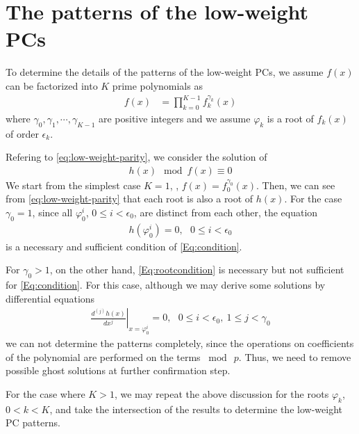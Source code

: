 \section{The patterns of the low-weight PCs}
\label{sec3}
To determine the details of the patterns of the low-weight PCs, we assume $f(x)$ can be factorized into $K$ prime polynomials as 
\begin{align}
f(x)&=\prod_{k=0}^{K-1}f_k^{\gamma_k}(x)
\end{align}
where $\gamma_0,\gamma_1,\cdots,\gamma_{K-1}$ are positive integers and we assume $\varphi_k$ is a root of $f_{k}(x)$ of order $\epsilon_k$.

Refering to \eqref{eq:low-weight-parity}, we consider the solution of
\begin{align}
	h(x) \mod f(x) \equiv 0
	\label{Eq:condition}
\end{align}
%
We start from the simplest case $K=1$, \ie, $f(x) = f_0^{\gamma_0}(x)$. Then, we can see from \eqref{eq:low-weight-parity} that each root is also a root of $h(x)$. For the case $\gamma_0 = 1$, since all $\varphi_0^i$, $0 \leq i < \epsilon_0$, are distinct from each other, the equation
\begin{align}
	h(\varphi_0^i)=0,~~~ 0 \leq i < \epsilon_0
	\label{Eq:rootcondition}
\end{align}
is a necessary and sufficient condition of \eqref{Eq:condition}. 

For $\gamma_0 > 1$, on the other hand, \eqref{Eq:rootcondition} is necessary but not sufficient for \eqref{Eq:condition}. For this case, although we may derive some solutions by differential equations
\begin{align}
\left.\frac{d^{(j)}h(x)}{d x^j}\right|_{x=\varphi_0^i}=0,~~~0 \leq i < \epsilon_0,~1 \leq j < \gamma_0
\label{Eq:differential}
\end{align}
we can not determine the patterns completely, since the operations on coefficients of the polynomial are performed on the terms $\bmod~ p$. Thus, we need to remove possible ghost solutions at further confirmation step.

For the case where $K>1$, we may repeat the above discussion for the roots $\varphi_k$, $0 < k < K$, and take the intersection of the results to determine the low-weight PC patterns.

